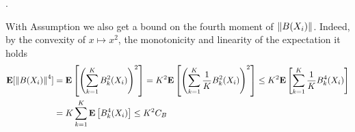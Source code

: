 \begin{assumption}
  .
\end{assumption}
\begin{remark}
With Assumption we also get a bound on the fourth moment of 
  $
  \left\lVert B(X_{i})\right\rVert
  $. Indeed, by the convexity of 
  $x\mapsto x^2$, the monotonicity and linearity of the expectation it holds   
  \begin{align}
    \begin{split}
  \mathbf{E}[
  \left\lVert B(X_{i})\right\rVert^4
  ] 
  &=
  \mathbf{E}
  \left[ 
    \left( 
      \sum_{k=1}^{K}
      B_k^2(X_i)
    \right)^2
  \right]
  =
  K^2
  \mathbf{E}
  \left[ 
    \left( 
      \sum_{k=1}^{K}
      \frac{1}{K}
      B_k^2(X_i)
    \right)^2
  \right]
  \le
  K^2
  \mathbf{E}
  \left[ 
      \sum_{k=1}^{K}
      \frac{1}{K}
      B_k^4(X_i)
  \right]
  \\
  &=
  K
  \sum_{k=1}^{K}
  \mathbf{E}
  \left[ 
      B_k^4(X_i)
  \right]
  \le
  K^2 C_B
  \end{split}
  \end{align}
\end{remark}
